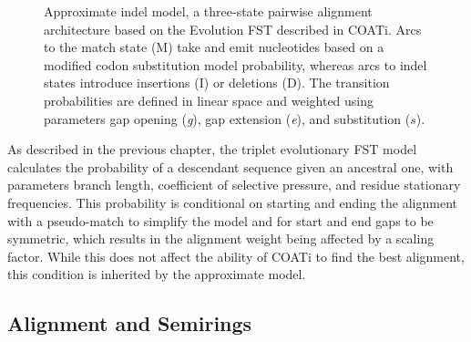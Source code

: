 \begin{figure}[!ht]
    \centering
    \resizebox{0.95\textwidth}{!}{
    
    }
    \caption[Approximate Indel Model]{Approximate indel model, a three-state pairwise alignment architecture based on the Evolution FST described in COATi. Arcs to the match state (M) take and emit nucleotides based on a modified codon substitution model probability, whereas arcs to indel states introduce insertions (I) or deletions (D). The transition probabilities are defined in linear space and weighted using parameters gap opening (\textit{g}), gap extension (\textit{e}), and substitution ($s$).}
    \label{fig:marginal-model}
\end{figure}


As described in the previous chapter, the triplet evolutionary FST model calculates the probability of a descendant sequence given an ancestral one, with parameters branch length, coefficient of selective pressure, and residue stationary frequencies. This probability is conditional on starting and ending the alignment with a pseudo-match to simplify the model and for start and end gaps to be symmetric, which results in the alignment weight being affected by a scaling factor. While this does not affect the ability of COATi to find the best alignment, this condition is inherited by the approximate model.

\subsection{Alignment and Semirings} %


